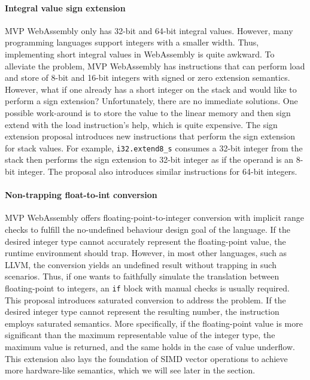\paragraph{Integral value sign extension}
MVP WebAssembly only has 32-bit and 64-bit integral values. However, many
programming languages support integers with a smaller width. Thus, implementing
short integral values in WebAssembly is quite awkward. To alleviate the problem,
MVP WebAssembly has instructions that can perform load and store of 8-bit and
16-bit integers with signed or zero extension semantics. However, what if one
already has a short integer on the stack and would like to perform a sign
extension?  Unfortunately, there are no immediate solutions. One possible
work-around is to store the value to the linear memory and then sign extend with
the load instruction's help, which is quite expensive. The sign extension
proposal introduces new instructions that perform the sign extension for stack
values. For example, \texttt{i32.extend8\_s} consumes a 32-bit integer from the
stack then performs the sign extension to 32-bit integer as if the operand is an
8-bit integer. The proposal also introduces similar instructions for 64-bit
integers.

\paragraph{Non-trapping float-to-int conversion}
MVP WebAssembly offers floating-point-to-integer conversion with implicit range
checks to fulfill the no-undefined behaviour design goal of the language. If the
desired integer type cannot accurately represent the floating-point value, the
runtime environment should trap. However, in most other languages, such as LLVM,
the conversion yields an undefined result without trapping in such scenarios.
Thus, if one wants to faithfully simulate the translation between floating-point
to integers, an \texttt{if} block with manual checks is usually required. This
proposal introduces saturated conversion to address the problem. If the desired
integer type cannot represent the resulting number, the instruction employs
saturated semantics. More specifically, if the floating-point value is more
significant than the maximum representable value of the integer type, the
maximum value is returned, and the same holds in the case of value underflow.
This extension also lays the foundation of SIMD vector operations to achieve
more hardware-like semantics, which we will see later in the section.

